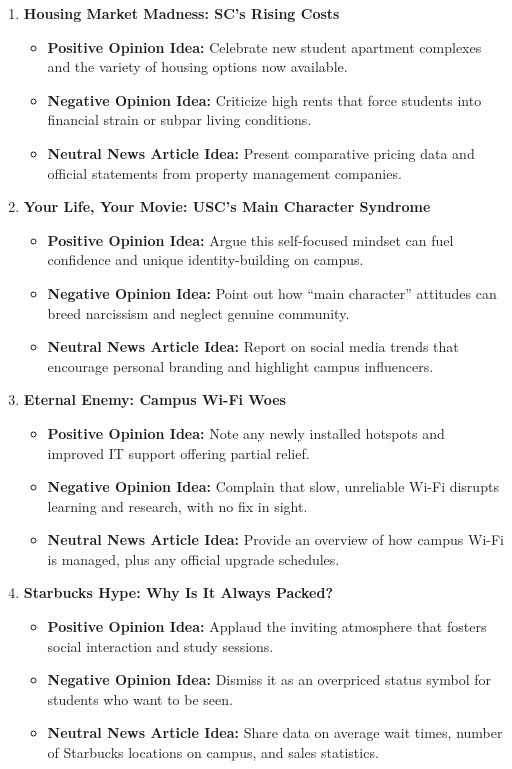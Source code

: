 \documentclass{article}
\begin{document}
\begin{enumerate}
    \item \textbf{Housing Market Madness: SC’s Rising Costs}
    \begin{itemize}
        \item \textbf{Positive Opinion Idea:} Celebrate new student apartment complexes and the variety of housing options now available.
        \item \textbf{Negative Opinion Idea:} Criticize high rents that force students into financial strain or subpar living conditions.
        \item \textbf{Neutral News Article Idea:} Present comparative pricing data and official statements from property management companies.
    \end{itemize}

    \item \textbf{Your Life, Your Movie: USC’s Main Character Syndrome}
    \begin{itemize}
        \item \textbf{Positive Opinion Idea:} Argue this self-focused mindset can fuel confidence and unique identity-building on campus.
        \item \textbf{Negative Opinion Idea:} Point out how “main character” attitudes can breed narcissism and neglect genuine community.
        \item \textbf{Neutral News Article Idea:} Report on social media trends that encourage personal branding and highlight campus influencers.
    \end{itemize}

    \item \textbf{Eternal Enemy: Campus Wi-Fi Woes}
    \begin{itemize}
        \item \textbf{Positive Opinion Idea:} Note any newly installed hotspots and improved IT support offering partial relief.
        \item \textbf{Negative Opinion Idea:} Complain that slow, unreliable Wi-Fi disrupts learning and research, with no fix in sight.
        \item \textbf{Neutral News Article Idea:} Provide an overview of how campus Wi-Fi is managed, plus any official upgrade schedules.
    \end{itemize}

    \item \textbf{Starbucks Hype: Why Is It Always Packed?}
    \begin{itemize}
        \item \textbf{Positive Opinion Idea:} Applaud the inviting atmosphere that fosters social interaction and study sessions.
        \item \textbf{Negative Opinion Idea:} Dismiss it as an overpriced status symbol for students who want to be seen.
        \item \textbf{Neutral News Article Idea:} Share data on average wait times, number of Starbucks locations on campus, and sales statistics.
    \end{itemize}


\end{enumerate}
\end{document}
